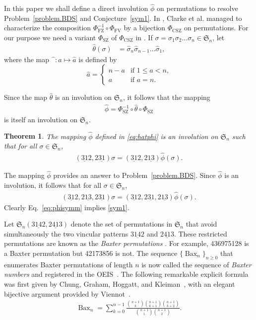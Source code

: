 \documentclass[12pt,reqno]{amsart}
\numberwithin{equation}{section}
\theoremstyle{plain}
\newtheorem{theorem}{Theorem}[section]
\theoremstyle{definition}
\def\Sym{\mathfrak{S}}
\def\FV{\mathrm{FV}}
\def\FZ{\mathrm{FZ}}
\def\CSZ{\mathrm{CSZ}}
\def\SZ{\mathrm{SZ}}
\def\rasc{\mathrm{2\underline{13}}}
\def\rdes{\mathrm{2\underline{31}}}
\def\ldes{\mathrm{\underline{31}2}}
\def\baxter{\mathrm{3\underline{14}2,2\underline{41}3}}
\def\Bax{\operatorname{Bax}}
\begin{document}
In this paper we shall define a direct involution $\widehat{\phi}$  on permutations to resolve Problem~\ref{problem.BDS} and  Conjecture~\eqref{sym1}.  
In \cite{CSZ97},  Clarke et al.  managed to characterize 
 the composition $\Phi^{-1}_{\FZ}\circ \Phi_{\FV}$  by a  bijection $\Phi_{\CSZ}$ on permutations.
For our purpose we need a
variant $\Phi_{\SZ}$  of $\Phi_{\CSZ}$  in \cite{SZ10}. 
If $\sigma=\sigma_1\sigma_2\ldots \sigma_n\in \Sym_n$, let
\begin{align}\label{def:hattheta}
\widehat{\theta}(\sigma) &= \widehat{\sigma}_n\widehat{\sigma}_{n-1}\ldots\widehat{\sigma}_1,
\end{align}
where the map $\widehat{\phantom{a}}: a\mapsto \widehat{a}$ is defined by
$$\widehat{a} =\begin{cases}
n-a & \text{if $1\le a<n$,}\\
a & \text{if $a=n$.}
\end{cases}$$

Since the map $\widehat{\theta}$ is an involution on $\Sym_n$, it follows that the mapping
\begin{align}\label{eq:hatphi}
\widehat{\phi} = \Phi^{-1}_{\SZ} \circ \widehat{\theta} \circ \Phi_{\SZ}
\end{align}
is itself an involution on $\Sym_n$.

\begin{theorem}\label{thm:hatphi}
The mapping $\widehat{\phi}$ defined in \eqref{eq:hatphi} is an involution on $\Sym_n$ such that
for all $\sigma\in\Sym_n$,
\begin{align}\label{eq:phi213}
(\ldes, \rdes) \sigma=(\ldes, \rasc)\widehat{\phi}(\sigma).
\end{align} 
\end{theorem}
The mapping $\widehat{\phi}$ provides an answer to Problem~\ref{problem.BDS}.
Since $\widehat\phi$ is an involution, it follows that  for all $\sigma\in\Sym_n$,
\begin{align}\label{eq:phisymm}
(\ldes, \rasc,\rdes)\sigma = (\ldes, \rdes,\rasc)\widehat{\phi}(\sigma).
\end{align}
Clearly Eq.~\eqref{eq:phisymm} implies  \eqref{sym1}.



Let $\Sym_n(\baxter)$ denote the set of permutations in $\Sym_n$ that avoid simultaneously the two vincular patterns $3\underline{14}2$ and $2\underline{41}3$. These restricted  permutations are known as the \emph{Baxter permutations} \cite[Chapter 2.2.4]{Kit11}. For example, 436975128 is a Baxter permutation but 42173856 is not. The sequence $\{\Bax_n\}_{n\ge 0}$ that enumerates Baxter permutations of length $n$ is now called the sequence of \emph{Baxter numbers} and registered in the OEIS~\cite[A001181]{OEIS}. The following remarkable explicit formula  was first given by Chung, Graham, Hoggatt, and Kleiman~\cite[Eq.~(1) on p.~383]{CGHK78}, with an elegant bijective argument provided by Viennot~\cite{Vi81}.
\begin{align}
\Bax_n = \sum_{k=0}^{n-1}\frac{\binom{n+1}{k}\binom{n+1}{k+1}\binom{n+1}{k+2}}{\binom{n+1}{1}\binom{n+1}{2}}.
\end{align}
\end{document}
